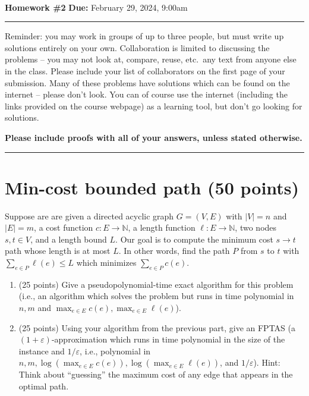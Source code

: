 \documentclass[11pt]{article}
\newcommand{\N}{\ensuremath{\mathbb N}}
\begin{document}
\\
{{\bf Homework \#2}} \hfill {{\bf Due:} February 29, 2024, 9:00am} \\
\rule[0.1in]{\textwidth}{0.4pt}

Reminder: you may work in groups of up to three people, but must write up solutions entirely on your own.  Collaboration is limited to discussing the problems -- you may not look at, compare, reuse, etc.~any text from anyone else in the class.  Please include your list of collaborators on the first page of your submission.  Many of these problems have solutions which can be found on the internet -- please don't look.  You can of course use the internet (including the links provided on the course webpage) as a learning tool, but don't go looking for solutions.  

\textbf{Please include proofs with all of your answers, unless stated otherwise.}

\noindent \rule[0.1in]{\textwidth}{0.4pt}

\section{Min-cost bounded path (50 points)}
Suppose are are given a directed acyclic graph $G= (V, E)$ with $|V| = n$ and $|E|=m$, a cost function $c : E \rightarrow \N$, a length function $\ell : E \rightarrow \N$, two nodes $s,t \in V$, and a length bound $L$.  Our goal is to compute the minimum cost $s \rightarrow t$ path whose length is at most $L$.  In other words, find the path $P$ from $s$ to $t$ with $\sum_{e \in P} \ell(e) \leq L$ which minimizes $\sum_{e \in P} c(e)$.  

\begin{enumerate}
\item (25 points) Give a pseudopolynomial-time exact algorithm for this problem (i.e., an algorithm which solves the problem but runs in time polynomial in $n, m$ and $\max_{e \in E} c(e), \max_{e \in E} \ell(e)$).  

\item (25 points) Using your algorithm from the previous part, give an FPTAS (a $(1+\varepsilon)$-approximation which runs in time polynomial in the size of the instance and $1/\varepsilon$, i.e., polynomial in $n, m, \log(\max_{e \in E} c(e)), \log(\max_{e \in E} \ell(e))$, and $1/\varepsilon$).  Hint: Think about ``guessing'' the maximum cost of any edge that appears in the optimal path.

\end{enumerate}
\end{document}
